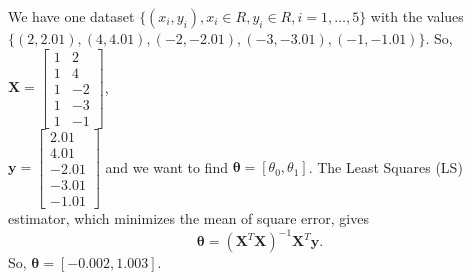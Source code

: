 \documentclass[12pt]{book}
\begin{document}
\noindent
We have one dataset $\{(x_i,y_i), x_i\in R, y_i \in R, i=1,\dots,5\}$ with the values \\ $\{(2,2.01),(4, 4.01), (-2, -2.01), (-3, -3.01), (-1, -1.01)\}$. So, $\bm{X} = \begin{bmatrix}
1 & 2 \\
1 & 4\\
1 & -2 \\
1 & -3 \\
1 & -1
\end{bmatrix}$, \\
$\bm{y} = \begin{bmatrix}
2.01 \\
4.01\\
-2.01  \\
-3.01 \\
-1.01
\end{bmatrix}$ and we want to find $\bm{\theta}=[\theta_0,\theta_1]$. The Least Squares (LS) estimator, which minimizes the mean of square error, gives
\begin{equation*}
\bm{\theta}= (\bm{X}^T\bm{X})^{-1}\bm{X}^T\bm{y}.
\end{equation*}
So, $\bm\theta = [-0.002,1.003]$.
\end{document}
